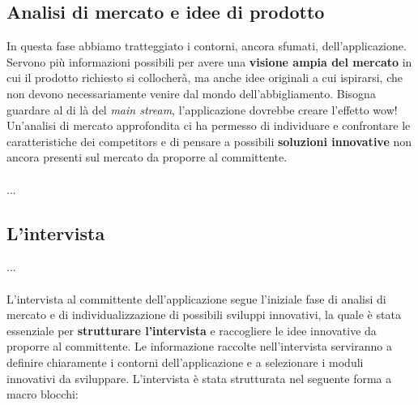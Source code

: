 \documentclass[12pt]{article}
\begin{document}
\subsection{Analisi di mercato e idee di prodotto} 
In questa fase abbiamo tratteggiato i contorni, ancora sfumati, dell'applicazione. Servono più informazioni possibili per avere una \textbf{visione ampia del mercato} in cui il prodotto richiesto si collocherà, ma anche idee originali a cui ispirarsi, che non devono necessariamente venire dal mondo dell'abbigliamento. Bisogna guardare al di là del {\em main stream}, l'applicazione dovrebbe creare l'effetto wow!
Un'analisi di mercato approfondita ci ha permesso di individuare e confrontare le caratteristiche dei competitors e di pensare a possibili \textbf{soluzioni innovative} non ancora presenti sul mercato da proporre al committente.
\\
\\
...
\\

 
 
\subsection{L'intervista}
...
\\
\\
L'intervista al committente dell'applicazione segue l'iniziale fase di analisi di mercato e di individualizzazione di possibili sviluppi innovativi, la quale è stata essenziale per \textbf{strutturare l'intervista} e raccogliere le idee innovative da proporre al committente. Le informazione raccolte nell'intervista serviranno a definire chiaramente i contorni dell'applicazione e a selezionare i moduli innovativi da sviluppare. L'intervista è stata strutturata nel seguente forma a macro blocchi:
\end{document}

